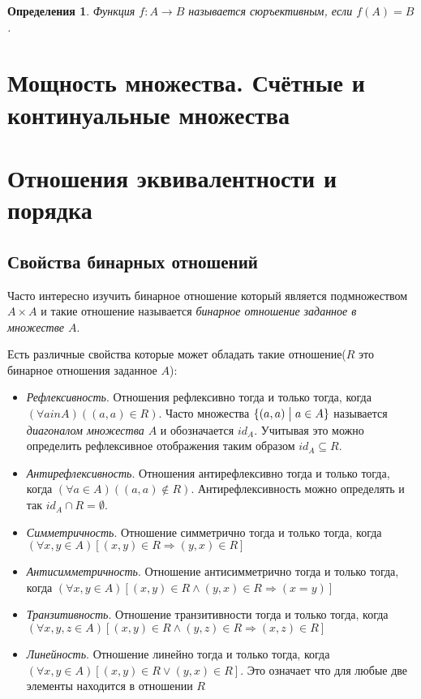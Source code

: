 \documentclass[a4paper, 16pt, oneside]{book}
\newtheorem{Definition}{Определения}[theorem]
\begin{document}
\begin{Definition}
	\label{definition:surjective}
	Функция \(f: A \rightarrow B\) называется сюръективным, если \({f(A) = B}\).
\end{Definition}

\section{Мощность множества. Счётные и континуальные множества}

\section{Отношения эквивалентности и порядка}

\subsection{Свойства бинарных отношений}

\par Часто интересно изучить бинарное отношение который является подмножеством \(A \times A\)
и такие отношение называется \textit{бинарное отношение заданное в множестве \(A\)}.

\par Есть различные свойства которые может обладать такие отношение(\(R\) это бинарное отношения заданное \(A\)):
\begin{itemize}
	\item \textit{Рефлексивность}. Отношения рефлексивно тогда и только тогда, когда \((\forall a in A)((a, a) \in R)\).
	Часто множества \(\{(a, a) \bigm| a \in A\}\) называется \textit{диагоналом множества \(A\)} и обозначается \(id_A\).
	Учитывая это можно определить рефлексивное отображения таким образом \(id_A \subseteq R\).
	\item \textit{Антирефлексивность}. Отношения антирефлексивно тогда и только тогда, когда \((\forall a \in A)((a, a) \notin R)\).
	Антирефлексивность можно определять и так \(id_A \cap R = \emptyset\).
	\item \textit{Симметричность}. Отношение симметрично тогда и только тогда, когда \((\forall x,y \in A)[(x, y) \in R \Rightarrow (y, x) \in R]\)
	\item \textit{Антисимметричность}. Отношение антисимметрично тогда и только тогда, когда \((\forall x,y \in A)[(x, y) \in R \land (y, x) \in R \Rightarrow (x = y)]\)
	\item \textit{Транзитивность}. Отношение транзитивности тогда и только тогда, когда \((\forall x,y,z \in A)[(x, y) \in R \land (y, z) \in R \Rightarrow (x, z) \in R]\)
	\item \textit{Линейность}. Отношение линейно тогда и только тогда, когда \((\forall x,y \in A)[(x, y) \in R \lor (y, x) \in R]\). Это означает что для любые две элементы находится в отношении \(R\)
\end{itemize}
\end{document}
